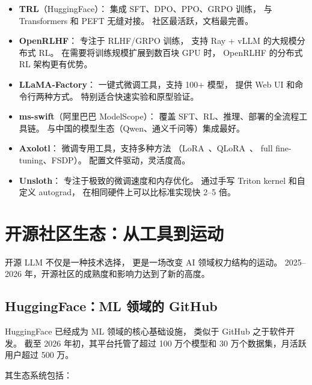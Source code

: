 \begin{itemize}[noitemsep]
  \item \textbf{TRL}（HuggingFace）：
        集成 SFT、DPO、PPO、GRPO 训练，
        与 Transformers 和 PEFT 无缝对接。
        社区最活跃，文档最完善。
  \item \textbf{OpenRLHF}：
        专注于 RLHF/GRPO 训练，
        支持 Ray + vLLM 的大规模分布式 RL。
        在需要将训练规模扩展到数百块 GPU 时，
        OpenRLHF 的分布式 RL 架构更有优势。
  \item \textbf{LLaMA-Factory}：
        一键式微调工具，支持 100+ 模型，
        提供 Web UI 和命令行两种方式。
        特别适合快速实验和原型验证。
  \item \textbf{ms-swift}（阿里巴巴 ModelScope）：
        覆盖 SFT、RL、推理、部署的全流程工具链。
        与中国的模型生态（Qwen、通义千问等）集成最好。
  \item \textbf{Axolotl}：
        微调专用工具，支持多种方法
        （LoRA~\cite{hu2021lora}、QLoRA~\cite{dettmers2023qlora}、
        full fine-tuning、FSDP）。
        配置文件驱动，灵活度高。
  \item \textbf{Unsloth}：
        专注于极致的微调速度和内存优化。
        通过手写 Triton kernel 和自定义 autograd，
        在相同硬件上可以比标准实现快 2--5 倍。
\end{itemize}

\section{开源社区生态：从工具到运动}
\label{sec:opensource-ecosystem}

开源 LLM 不仅是一种技术选择，
更是一场改变 AI 领域权力结构的运动。
2025--2026 年，开源社区的成熟度和影响力达到了新的高度。

\subsection{HuggingFace：ML 领域的 GitHub}

HuggingFace 已经成为 ML 领域的核心基础设施，
类似于 GitHub 之于软件开发。
截至 2026 年初，其平台托管了超过 100 万个模型和
30 万个数据集，月活跃用户超过 500 万。

其生态系统包括：

